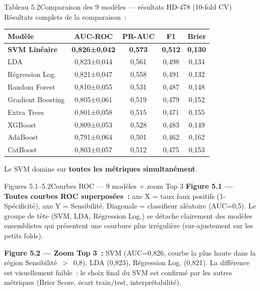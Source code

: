 \documentclass[12pt,a4paper]{article}
\begin{document}
\begin{figbox}{Tableau 5.2}{Comparaison des 9 modèles --- résultats HD-478 (10-fold CV)}
Résultats complets de la comparaison~:
\begin{center}
\small
\begin{tabular}{lcccc}
\toprule
\textbf{Modèle} & \textbf{AUC-ROC} & \textbf{PR-AUC} & \textbf{F1} & \textbf{Brier} \\
\midrule
\rowcolor{green!10}\textbf{SVM Linéaire} & \textbf{0{,}826±0{,}042} & \textbf{0{,}573} & \textbf{0{,}512} & \textbf{0{,}130} \\
LDA & 0{,}823±0{,}044 & 0{,}561 & 0{,}498 & 0{,}134 \\
Régression Log. & 0{,}821±0{,}047 & 0{,}558 & 0{,}491 & 0{,}132 \\
Random Forest & 0{,}810±0{,}055 & 0{,}531 & 0{,}487 & 0{,}148 \\
Gradient Boosting & 0{,}805±0{,}061 & 0{,}519 & 0{,}479 & 0{,}152 \\
Extra Trees & 0{,}801±0{,}058 & 0{,}515 & 0{,}471 & 0{,}155 \\
XGBoost & 0{,}809±0{,}053 & 0{,}528 & 0{,}483 & 0{,}149 \\
AdaBoost & 0{,}791±0{,}064 & 0{,}501 & 0{,}462 & 0{,}162 \\
CatBoost & 0{,}803±0{,}057 & 0{,}512 & 0{,}475 & 0{,}153 \\
\bottomrule
\end{tabular}
\end{center}
Le SVM domine sur \textbf{toutes les métriques simultanément}.
\end{figbox}

\begin{figbox}{Figures 5.1--5.2}{Courbes ROC --- 9 modèles + zoom Top 3}
\textbf{Figure 5.1 --- Toutes courbes ROC superposées~:} axe X = taux faux
positifs (1-Spécificité), axe Y = Sensibilité. Diagonale = classifieur aléatoire
(AUC=0{,}5). Le groupe de tête (SVM, LDA, Régression Log.) se détache clairement
des modèles ensemblistes qui présentent une courbure plus irrégulière
(sur-ajustement sur les petits folds).

\textbf{Figure 5.2 --- Zoom Top 3~:} SVM (AUC=0{,}826, courbe la plus haute
dans la région Sensibilité~$>$~0{,}8), LDA (0{,}823), Régression Log. (0{,}821).
La différence est visuellement faible~: le choix final du SVM est confirmé par
les autres métriques (Brier Score, écart train/test, interprétabilité).
\end{figbox}
\end{document}
